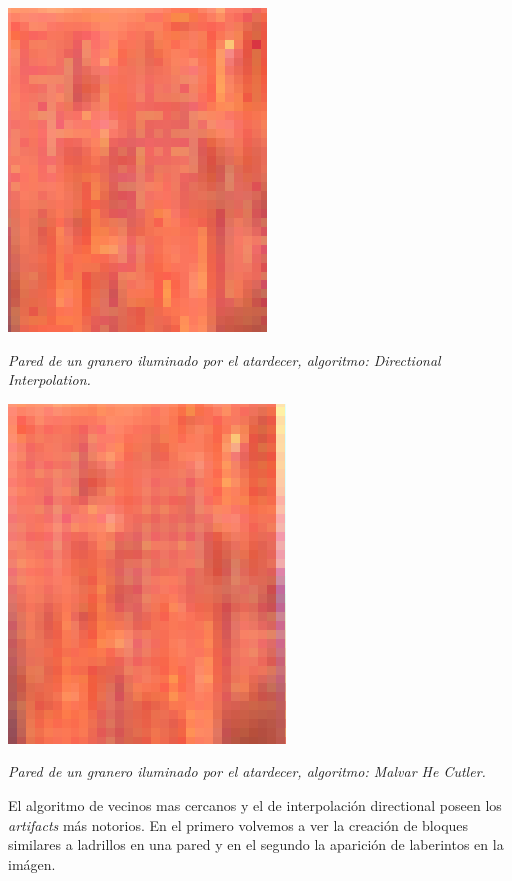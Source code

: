 	\begin{center}
		\includegraphics[scale=.5]{../enunciado/images_files/cualitativo/farm_directional.png}
		\vspace{2pt}
		\par
		\footnotesize\textit{Pared de un granero iluminado por el atardecer, algoritmo: Directional Interpolation.}
	\end{center}


	\begin{center}
		\includegraphics[scale=.5]{../enunciado/images_files/cualitativo/farm_malvar.png}
		\vspace{2pt}
		\par
		\footnotesize\textit{Pared de un granero iluminado por el atardecer, algoritmo: Malvar He Cutler.}
	\end{center}

El algoritmo de vecinos mas cercanos y el de interpolación directional poseen los \textit{artifacts} más notorios. En el primero volvemos a ver la creación de bloques similares a ladrillos en una pared y en el segundo la aparición de laberintos en la imágen.

